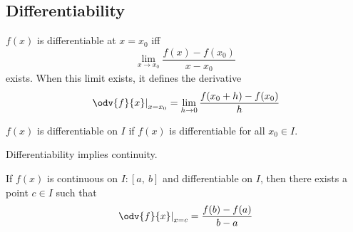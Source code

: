 \documentclass{article}
\begin{document}
\subsection{Differentiability}
\begin{theorem}[Differentiability]
    \(f(x)\) is differentiable at \(x=x_0\) iff
    \begin{equation*}
        \lim_{x\to x_0} \frac{f(x)-f(x_0)}{x-x_0}
    \end{equation*}
    exists. When this limit exists, it defines the derivative
    \begin{equation*}
        \left.\odv{f}{x}\right|_{x=x_0} = \lim_{h\to 0} \frac{f(x_0+h)-f(x_0)}{h}
    \end{equation*}
\end{theorem}
\begin{theorem}
    \(f(x)\) is differentiable on \(I\) if \(f(x)\) is differentiable for all
    \(x_0\in I\).
\end{theorem}
\begin{theorem}
    Differentiability implies continuity.
\end{theorem}
\begin{theorem}
    If \(f(x)\) is continuous on \(I:\left[ a,\:b \right]\) and differentiable on
    \(I\), then there exists a point \(c\in I\) such that
    \begin{equation*}
        \left.\odv{f}{x}\right|_{x=c}=\frac{f(b)-f(a)}{b-a}
    \end{equation*}
\end{theorem}
\newpage
\end{document}
